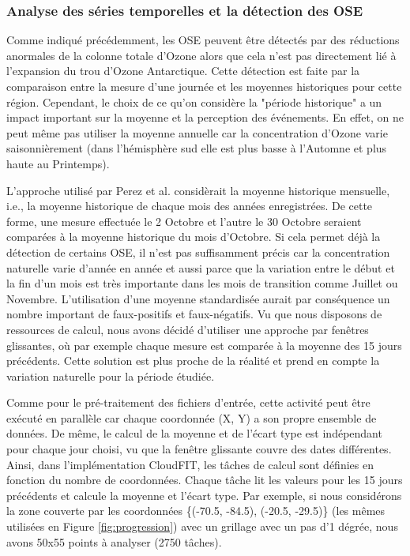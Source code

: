 \subsubsection{Analyse des séries temporelles et la détection des OSE\label{sec:timeseries}}

Comme indiqué précédemment, les OSE peuvent être détectés par des réductions anormales de la colonne totale d'Ozone alors que cela n'est pas directement lié à l'expansion du trou d'Ozone Antarctique. Cette détection est faite par la comparaison entre la mesure d'une journée et les moyennes historiques pour cette région. Cependant, le choix de ce qu'on considère la "période historique" a un impact important sur la moyenne et la perception des événements. En effet, on ne peut même pas utiliser la moyenne annuelle car la concentration d'Ozone varie saisonnièrement (dans l'hémisphère sud elle est plus basse à l'Automne et plus haute au Printemps). 

L'approche utilisé par Perez et al.\cite{Peres2013} considèrait la moyenne historique mensuelle, i.e., la moyenne historique de chaque mois des années enregistrées. De cette forme, une mesure effectuée le 2 Octobre et l'autre le 30 Octobre seraient comparées à la moyenne historique du mois d'Octobre. Si cela permet déjà la détection de certains OSE, il n'est pas suffisamment précis car la concentration naturelle varie d'année en année et aussi parce que la variation entre le début et la fin d'un mois est très importante dans les mois de transition comme Juillet ou Novembre. L'utilisation d'une moyenne standardisée aurait par conséquence un nombre important de faux-positifs et faux-négatifs. Vu que nous disposons de ressources de calcul, nous avons décidé d'utiliser une approche par fenêtres glissantes, où par exemple chaque mesure est comparée à la moyenne des 15 jours précédents. Cette solution est plus proche de la réalité et prend en compte la variation naturelle pour la période étudiée.

Comme pour le pré-traitement des fichiers d'entrée, cette activité peut être exécuté en parallèle car chaque coordonnée (X, Y) a son propre ensemble de données. De même, le calcul de la moyenne et de l'écart type est indépendant pour chaque jour choisi, vu que la fenêtre glissante couvre des dates différentes. Ainsi, dans l'implémentation CloudFIT, les tâches de calcul sont définies en fonction du nombre de coordonnées. Chaque tâche lit les valeurs pour les 15 jours précédents et calcule la moyenne et l'écart type. Par exemple, si nous considérons la zone couverte par les coordonnées \{(-70.5, -84.5), (-20.5, -29.5)\} (les mêmes utilisées en Figure \ref{fig:progression}) avec un grillage avec un pas d'1 dégrée, nous avons 50x55 points à analyser (2750 tâches). 


